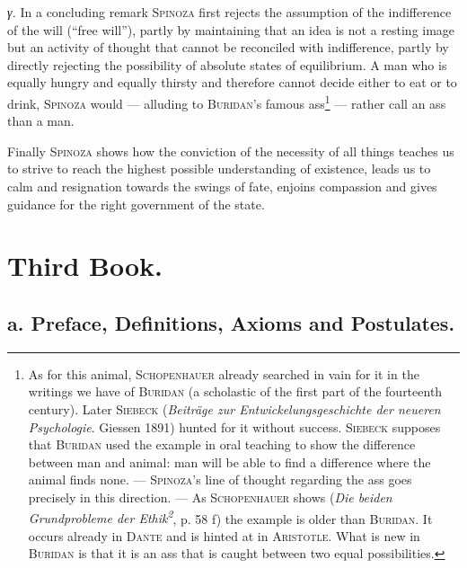 \documentclass[12pt]{article}
\newcommand{\opage}[1]{\marginnote{\footnotesize\textit{[#1]}}}
\begin{document}
\textit{γ.} In a concluding remark \textsc{Spinoza} first rejects the assumption of the
indifference of the will (``free will''), partly by maintaining that an idea is not a resting
image but an activity of thought that cannot be reconciled with indifference, partly by
directly rejecting the possibility of absolute states of equilibrium. A man who is equally
hungry and equally thirsty and therefore cannot decide either to eat or to drink,
\textsc{Spinoza} would --- alluding to \textsc{Buridan}'s famous ass\footnote{As for this
animal, \textsc{Schopenhauer} already searched in vain for it in the writings we have of
\textsc{Buridan} (a scholastic of the first part of the fourteenth century). Later
\textsc{Siebeck} (\textit{Beiträge zur Entwickelungsgeschichte der neueren Psychologie}.
Giessen 1891) hunted for it without success. \textsc{Siebeck} supposes that \textsc{Buridan}
used the example in oral teaching to show the difference between man and animal: man will be
able to find a difference where the animal finds none. --- \textsc{Spinoza}'s line of thought
regarding the ass goes precisely in this direction. --- As \textsc{Schopenhauer} shows
(\textit{Die beiden Grundprobleme der Ethik\textsuperscript{2}}, p. 58 f) the example is
older than \textsc{Buridan}. It occurs already in \textsc{Dante} and is hinted at in
\textsc{Aristotle}. What is new in \textsc{Buridan} is that it is an ass that is caught
between two equal possibilities.} --- rather call an ass than a man.

Finally \textsc{Spinoza} shows how the conviction of the necessity of all things teaches us to
strive to reach the highest possible understanding of existence, leads us to calm and
resignation towards the swings of fate, enjoins compassion and gives guidance for the right
government of the state.

\opage{58}\section*{Third Book.}
\subsection*{a. Preface, Definitions, Axioms and Postulates.}
\end{document}
